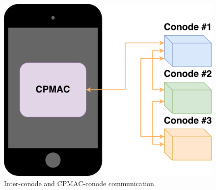 \begin{figure}[h]
\includegraphics[scale=.5]{graphic/communication.pdf}
\centering
\caption{Inter-conode and CPMAC-conode communication}
\end{figure}

